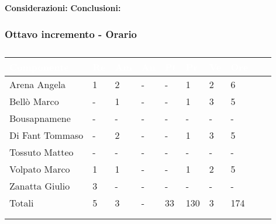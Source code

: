 {{\begin{longtable}{C{.4\freewidth} C{.2\freewidth} C{.2\freewidth}}
                \end{longtable}
                \textbf{Considerazioni:} 
                \textbf{Conclusioni:} 
            }
            }
            \subsubsection{Ottavo incremento - Orario} {
                \setlength{\freewidth}{\dimexpr\textwidth-30\tabcolsep}
            \renewcommand{\arraystretch}{1.0}
            \setlength{\aboverulesep}{0pt}
            \setlength{\belowrulesep}{0pt}
            \begin{longtable}{C{.3\freewidth} C{.1\freewidth} C{.1\freewidth} C{.1\freewidth} C{.1\freewidth} C{.1\freewidth} C{.1\freewidth} C{.1\freewidth} C{.1\freewidth} C{.3\freewidth}}
            \toprule
            \textcolor{white}{\textbf{Componente}}&
            \textcolor{white}{\textbf{Re}}&
            \textcolor{white}{\textbf{Am}}&
            \textcolor{white}{\textbf{An}}&
            \textcolor{white}{\textbf{Pt}}&
            \textcolor{white}{\textbf{Pr}}&
            \textcolor{white}{\textbf{Ve}}&
            \textcolor{white}{\textbf{Ore}} \\
            \toprule
            \endhead
    
            Arena Angela & 1 & 2 & - & - & 1 & 2 & 6\\      
            Bellò Marco & - & 1 & - & - & 1 & 3 & 5\\      
            Bousapnamene & - & - & - & - & - & - & -\\      
            Di Fant Tommaso & - & 2 & - & - & 1 & 3  & 5\\      
            Tossuto Matteo & - & - & - & - & - & -  & -\\      
            Volpato Marco & 1 & 1 & - & - & 1 & 2 &  5 \\      
            Zanatta Giulio & 3 & - & - & - & - & - & - \\      
            Totali & 5 & 3 & - & 33 & 130 & 3 & 174 \\
            \bottomrule
            \\
            \caption{}

            \end{longtable}
            }
            
